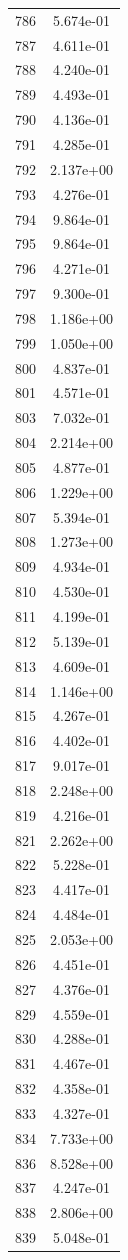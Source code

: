 \documentclass[12pt]{article}
\begin{document}
\begin{longtable}{@{}cc@{}}
786 & 5.674e-01 \\
787 & 4.611e-01 \\
788 & 4.240e-01 \\
789 & 4.493e-01 \\
790 & 4.136e-01 \\
791 & 4.285e-01 \\
792 & 2.137e+00 \\
793 & 4.276e-01 \\
794 & 9.864e-01 \\
795 & 9.864e-01 \\
796 & 4.271e-01 \\
797 & 9.300e-01 \\
798 & 1.186e+00 \\
799 & 1.050e+00 \\
800 & 4.837e-01 \\
801 & 4.571e-01 \\
803 & 7.032e-01 \\
804 & 2.214e+00 \\
805 & 4.877e-01 \\
806 & 1.229e+00 \\
807 & 5.394e-01 \\
808 & 1.273e+00 \\
809 & 4.934e-01 \\
810 & 4.530e-01 \\
811 & 4.199e-01 \\
812 & 5.139e-01 \\
813 & 4.609e-01 \\
814 & 1.146e+00 \\
815 & 4.267e-01 \\
816 & 4.402e-01 \\
817 & 9.017e-01 \\
818 & 2.248e+00 \\
819 & 4.216e-01 \\
821 & 2.262e+00 \\
822 & 5.228e-01 \\
823 & 4.417e-01 \\
824 & 4.484e-01 \\
825 & 2.053e+00 \\
826 & 4.451e-01 \\
827 & 4.376e-01 \\
829 & 4.559e-01 \\
830 & 4.288e-01 \\
831 & 4.467e-01 \\
832 & 4.358e-01 \\
833 & 4.327e-01 \\
834 & 7.733e+00 \\
836 & 8.528e+00 \\
837 & 4.247e-01 \\
838 & 2.806e+00 \\
839 & 5.048e-01 \\

\bottomrule
\end{longtable}
\end{document}
